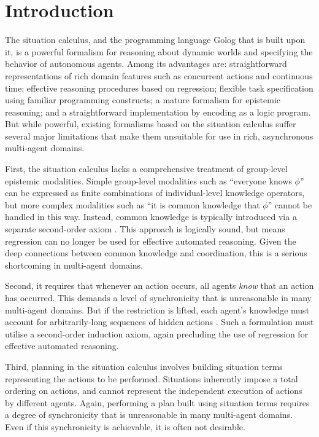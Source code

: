 


\chapter{Introduction}

The situation calculus, and the programming language Golog that is
built upon it, is a powerful formalism for reasoning about dynamic
worlds and specifying the behavior of autonomous agents. Among its
advantages are: straightforward representations of rich domain features
such as concurrent actions and continuous time; effective reasoning
procedures based on regression; flexible task specification using
familiar programming constructs; a mature formalism for epistemic
reasoning; and a straightforward implementation by encoding as a logic
program. But while powerful, existing formalisms based on the situation
calculus suffer several major limitations that make them unsuitable
for use in rich, asynchronous multi-agent domains.

First, the situation calculus lacks a comprehensive treatment of group-level
epistemic modalities. Simple group-level modalities such as {}``everyone
knows $\phi$'' can be expressed as finite combinations of individual-level
knowledge operators, but more complex modalities such as {}``it is
common knowledge that $\phi$'' cannot be handled in this way. Instead,
common knowledge is typically introduced via a separate second-order
axiom \citep{davis05fo_ma_theory,ghaderi07sc_joint_ability}. This
approach is logically sound, but means regression can no longer be
used for effective automated reasoning. Given the deep connections
between common knowledge and coordination, this is a serious shortcoming
in multi-agent domains.

Second, it requires that whenever an action occurs, all agents \emph{know}
that an action has occurred. This demands a level of synchronicity
that is unreasonable in many multi-agent domains. But if the restriction
is lifted, each agent's knowledge must account for arbitrarily-long
sequences of hidden actions \citep{Lesperance99sitcalc_approach}.
Such a formulation must utilise a second-order induction axiom, again
precluding the use of regression for effective automated reasoning.

Third, planning in the situation calculus involves building situation
terms representing the actions to be performed. Situations inherently
impose a total ordering on actions, and cannot represent the independent
execution of actions by different agents. Again, performing a plan
built using situation terms requires a degree of synchronicity that
is unreasonable in many multi-agent domains. Even if this synchronicity
is achievable, it is often not desirable.\\


